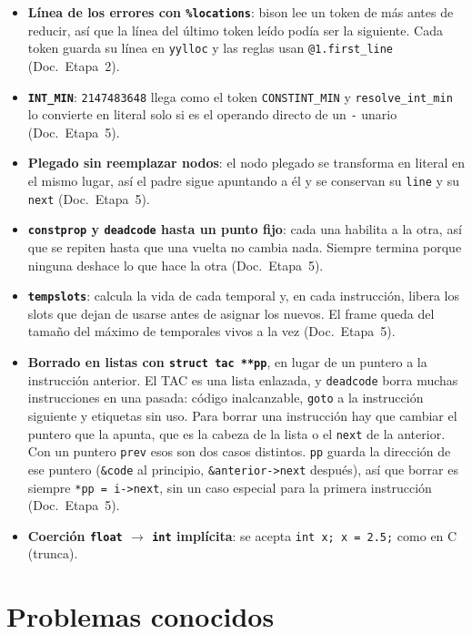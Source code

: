 \documentclass[11pt,a4paper]{article}
\newcommand{\code}[1]{\texttt{#1}}
\newcommand{\doc}[1]{(Doc.\ Etapa~#1)}
\begin{document}
\begin{itemize}
  \item \textbf{Línea de los errores con \code{\%locations}}: bison lee un token de más antes de reducir, así que la línea del último token leído podía ser la siguiente. Cada token guarda su línea en \code{yylloc} y las reglas usan \code{@1.first\_line} \doc{2}.
  \item \textbf{\code{INT\_MIN}}: \code{2147483648} llega como el token \code{CONSTINT\_MIN} y \code{resolve\_int\_min} lo convierte en literal solo si es el operando directo de un \code{-} unario \doc{5}.
  \item \textbf{Plegado sin reemplazar nodos}: el nodo plegado se transforma en literal en el mismo lugar, así el padre sigue apuntando a él y se conservan su \code{line} y su \code{next} \doc{5}.
  \item \textbf{\code{constprop} y \code{deadcode} hasta un punto fijo}: cada una habilita a la otra, así que se repiten hasta que una vuelta no cambia nada. Siempre termina porque ninguna deshace lo que hace la otra \doc{5}.
  \item \textbf{\code{tempslots}}: calcula la vida de cada temporal y, en cada instrucción, libera los slots que dejan de usarse antes de asignar los nuevos. El frame queda del tamaño del máximo de temporales vivos a la vez \doc{5}.
  \item \textbf{Borrado en listas con \code{struct tac **pp}}, en lugar de un puntero a la instrucción anterior. El TAC es una lista enlazada, y \code{deadcode} borra muchas instrucciones en una pasada: código inalcanzable, \code{goto} a la instrucción siguiente y etiquetas sin uso. Para borrar una instrucción hay que cambiar el puntero que la apunta, que es la cabeza de la lista o el \code{next} de la anterior. Con un puntero \code{prev} esos son dos casos distintos. \code{pp} guarda la dirección de ese puntero (\code{\&code} al principio, \code{\&anterior->next} después), así que borrar es siempre \code{*pp = i->next}, sin un caso especial para la primera instrucción \doc{5}.
  \item \textbf{Coerción \code{float} $\to$ \code{int} implícita}: se acepta \code{int x; x = 2.5;} como en C (trunca).\end{itemize}

\section{Problemas conocidos}
\end{document}
